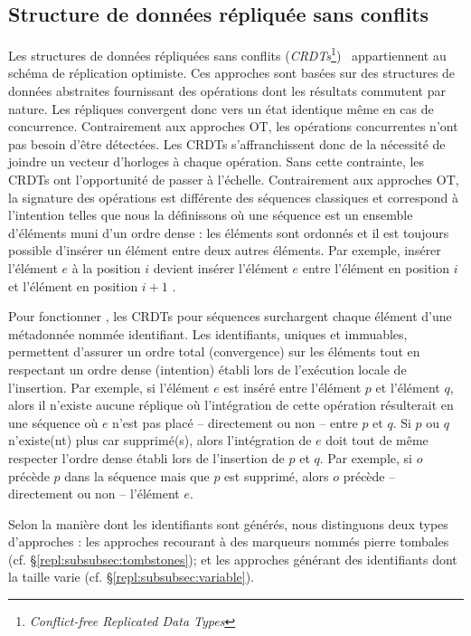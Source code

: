 \subsection{Structure de données répliquée sans conflits}
\label{repl:subsec:crdts}

Les structures de données répliquées sans conflits
(\emph{CRDTs}\footnote{\emph{Conflict-free Replicated Data
    Types}})~\cite{shapiro2011comprehensive, shapiro2011conflict} appartiennent
au schéma de réplication optimiste. Ces approches sont basées sur des structures
de données abstraites fournissant des opérations dont les résultats commutent
par nature. Les répliques convergent donc vers un état identique même en cas de
concurrence. Contrairement aux approches OT, les opérations concurrentes n'ont
pas besoin d'être détectées. Les CRDTs s'affranchissent donc de la nécessité de
joindre un vecteur d'horloges à chaque opération. Sans cette contrainte, les
CRDTs ont l'opportunité de passer à l'échelle. Contrairement aux approches OT,
la signature des opérations est différente des séquences \og classiques \fg et
correspond à l'intention telles que nous la définissons où une séquence est un
ensemble d'éléments muni d'un ordre dense : les éléments sont ordonnés et il est
toujours possible d'insérer un élément entre deux autres éléments. Par exemple,
\og insérer l'élément $e$ à la position $i$ \fg devient \og insérer l'élément
$e$ entre l'élément en position $i$ et l'élément en position $i+1$ \fg.

Pour fonctionner , les CRDTs pour séquences surchargent chaque élément d'une
métadonnée nommée identifiant. Les identifiants, uniques et immuables,
permettent d'assurer un ordre total (convergence) sur les éléments tout en
respectant un ordre dense (intention) établi lors de l'exécution locale de
l'insertion. Par exemple, si l'élément $e$ est inséré entre l'élément $p$ et
l'élément $q$, alors il n'existe aucune réplique où l'intégration de cette
opération résulterait en une séquence où $e$ n'est pas placé -- directement ou
non -- entre $p$ et $q$.  Si $p$ ou $q$ n'existe(nt) plus car supprimé(s), alors
l'intégration de $e$ doit tout de même respecter l'ordre dense établi lors de
l'insertion de $p$ et $q$. Par exemple, si $o$ précède $p$ dans la séquence mais
que $p$ est supprimé, alors $o$ précède -- directement ou non -- l'élément $e$.

Selon la manière dont les identifiants sont générés, nous distinguons deux types
d'approches : les approches recourant à des marqueurs nommés \og pierre tombales
\fg (cf. §\ref{repl:subsubsec:tombstones}); et les approches générant des
identifiants dont la taille varie (cf. §\ref{repl:subsubsec:variable}).

